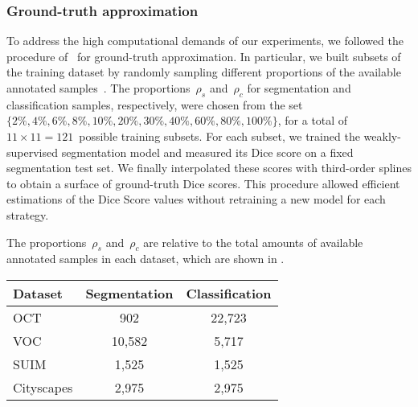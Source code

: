 \subsubsection{Ground-truth approximation}
To address the high computational demands of our experiments, we followed the procedure of~ for ground-truth approximation. 
In particular, we built subsets of the training dataset by randomly sampling different proportions of the available annotated samples~. The proportions~$\rho_s$ and~$\rho_c$ for segmentation and classification samples, respectively, were chosen from the set~$\{2\%, 4\%, 6\%, 8\%, 10\%, 20\%, 30\%, 40\%, 60\%,\allowbreak 80\%, 100\%\}$, for a total of $11\times{}11=121$~possible training subsets. For each subset, we trained the weakly-supervised segmentation model and measured its Dice score on a fixed segmentation test set. We finally interpolated these scores with third-order splines to obtain a surface of ground-truth Dice scores. This procedure allowed efficient estimations of the Dice Score values without retraining a new model for each strategy.

The proportions~$\rho_s$ and~$\rho_c$ are relative to the total amounts of available annotated samples in each dataset, which are shown in .

\begin{table}[h]
\centering
{}
\begin{tabular}{lcc}
\hline
{Dataset} & {Segmentation} & {Classification} \\ \hline
OCT & 902 & 22,723 \\
VOC & 10,582 & 5,717 \\
SUIM & 1,525 & 1,525 \\
Cityscapes & 2,975 & 2,975 \\ \hline
\end{tabular}

\end{table}
